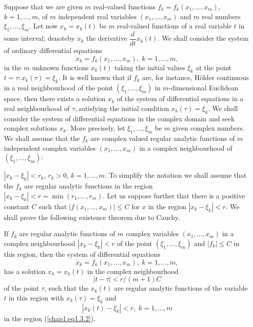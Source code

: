 Suppose that we are given $m$ real-valued functions $f_k = f_k (x_1, \ldots, x_m)$, $k =1 , \ldots, m$, of $m$ independent real variables $(x_1, \ldots, x_m)$ and $m$ real numbers $\xi_1, \ldots, \xi_m$. Let now $x_k = x_k(t)$ be $m$ real-valued functions of a real variable $t$ in some interval; denote\pageoriginale by $\dot{x}_k$ the derivative $\dfrac{d}{dt} x_k(t)$. We shall consider the system of ordinary differential equations
$$
\dot{x}_k = f_k (x_1, \ldots, x_m), \;k = 1, \ldots, m,
$$
in the $m$ unknown functions $x_k(t)$ taking the initial values $\xi_k$ at the point $t = \tau : x_k(\tau) = \xi_k$. It is well known that if $f_k$ are, for instance, H\"older continuous in a real neighbourhood of the point $(\xi_1, \ldots, \xi_m)$ in $m$-dimensional Euclidean space, then there exists a solution $x_k$ of the system of differential equations in a real neighbourhood of $\tau$, satisfying the initial condition $x_k(\tau) = \xi_k$. We shall consider the system of differential equations in the complex domain and seek complex solutions $x_k$. More precisely, let $\xi_1, \ldots, \xi_m$ be $m$ given complex numbers. We shall assume that the $f_k$ are complex valued regular analytic functions of $m$ independent complex variables $(x_1, \ldots, x_m)$ in a complex neighbourhood of $(\xi_1, \ldots, \xi_m)$:

$|x_k - \xi_k| < r_k$, $r_k > 0$, $k = 1, \ldots, m$. To simplify the notation we shall assume that the $f_k$ are regular analytic functions in the region $|x_k - \xi_k| < r = \min (r_1, \ldots, r_m)$. Let us suppose further that there is a positive constant $C$ such that $|f(x_1, \ldots, x_m)| \leq C$ for $x$ in the region $|x_k - \xi_k| < r$. We shall prove the following existence theorem due to Cauchy. 

\begin{theorem*} 
If $f_k$ are regular analytic functions of $m$ complex variables $(x_1, \ldots, x_m)$ in a complex neighbourhood $|x_k - \xi_k| < r$ of the point $(\xi_1, \ldots, \xi_m)$ and $|f_k| \leq C$ in this region, then the system of differential equations
\begin{equation*}
\dot{x}_k = f_k (x_1, \ldots, x_m) , \; k=1, \ldots, m,\tag{1.3.1}\label{chap1:eq1.3.1}
\end{equation*}\pageoriginale
has a solution $x_k = x_k(t)$ in the complex neighbourhood
\begin{equation*}
|t - \tau| < r / (m+1) C\tag{1.3.2}\label{chap1:eq1.3.2}
\end{equation*}
of the point $\tau$, such that the $x_k(t)$ are regular analytic functions of the variable $t$ in this region with $x_k(\tau) = \xi_k$ and 
$$
|x_k (t) - \xi_k| < r, \;k = 1, \ldots, m
$$
in the region (\ref{chap1:eq1.3.2}).
\end{theorem*}

